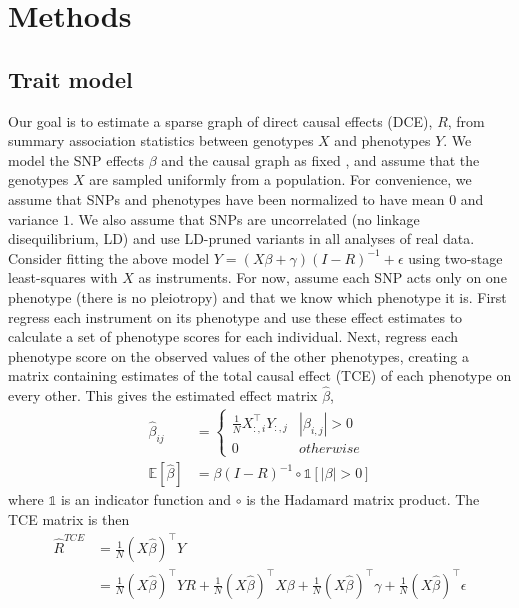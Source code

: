 \documentclass{article}
\begin{document}
\section{Methods}\label{methods}
\subsection{Trait model}
Our goal is to estimate a sparse graph of direct causal effects (DCE), $R$, from
summary association statistics between genotypes $X$ and phenotypes $Y$. We model
the SNP effects $\beta$ and the causal graph as fixed , and assume that the genotypes
$X$ are sampled uniformly  from a population. For convenience, we assume that SNPs
 and phenotypes have been normalized
 to have mean $0$ and variance $1$. We also assume that SNPs are uncorrelated (no linkage disequilibrium, LD)
and use LD-pruned variants in all analyses of real data.
Consider fitting the above model  $Y = (X\beta + \gamma)(I-R)^{-1} + \epsilon$
using two-stage least-squares with $X$ as instruments. For now,
 assume each SNP acts only on one phenotype
(there is no pleiotropy) and that we know which phenotype it is.
First regress each instrument on its phenotype and use these effect
 estimates to calculate a set of phenotype scores for each individual.
Next, regress each phenotype score on the observed values of the other phenotypes,
 creating a matrix containing estimates of the total causal effect (TCE) of
 each phenotype on every other. This gives the estimated effect matrix $\hat{\beta}$,
\begin{align*}
\hat{\beta}_{ij} &= \left\{
 \begin{array}{ll}
  \frac{1}{N} X_{:, i}^{\top}Y_{:,j} & |\beta_{i,j}| > 0 \\
  0 & otherwise
 \end{array} \right. \\
 \mathbb{E}[\hat{\beta} ] &= \beta (I-R)^{-1} \circ \mathds{1}[|\beta| > 0]
\end{align*}
where $\mathds{1}$ is an indicator function and $\circ$ is the Hadamard matrix
product. The TCE matrix is then
\begin{align*}
\hat{R}^{TCE} &= \frac{1}{N} (X\hat{\beta})^{\top} Y \\
  &= \frac{1}{N} (X\hat{\beta})^{\top} Y R + \frac{1}{N}(X\hat{\beta})^{\top} X \beta +
     \frac{1}{N}(X\hat{\beta})^{\top} \gamma + \frac{1}{N}(X\hat{\beta})^{\top} \epsilon 
  \end{align*}
\end{document}
